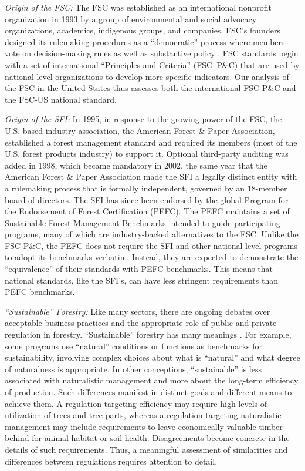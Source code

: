 \documentclass[
      12pt,
            Review ]{article}
\begin{document}
\emph{Origin of the FSC:} The FSC was established as an international nonprofit organization in 1993 by a group of environmental and social advocacy organizations, academics, indigenous groups, and companies. FSC's founders designed its rulemaking procedures as a ``democratic'' process where members vote on decision-making rules as well as substantive policy \citep{Meidinger2003}. FSC standards begin with a set of international ``Principles and Criteria'' (FSC--P\&C) that are used by national-level organizations to develop more specific indicators. Our analysis of the FSC in the United States thus assesses both the international FSC-P\&C and the FSC-US national standard.

\emph{Origin of the SFI:} In 1995, in response to the growing power of the FSC, the U.S.-based industry association, the American Forest \& Paper Association, established a forest management standard and required its members (most of the U.S. forest products industry) to support it. Optional third-party auditing was added in 1998, which became mandatory in 2002, the same year that the American Forest \& Paper Association made the SFI a legally distinct entity with a rulemaking process that is formally independent, governed by an 18-member board of directors. The SFI has since been endorsed by the global Program for the Endorsement of Forest Certification (PEFC). The PEFC maintains a set of Sustainable Forest Management Benchmarks intended to guide participating programs, many of which are industry-backed alternatives to the FSC. Unlike the FSC-P\&C, the PEFC does not require the SFI and other national-level programs to adopt its benchmarks verbatim. Instead, they are expected to demonstrate the ``equivalence'' of their standards with PEFC benchmarks. This means that national standards, like the SFI's, can have less stringent requirements than PEFC benchmarks.

\emph{``Sustainable'' Forestry:} Like many sectors, there are ongoing debates over acceptable business practices and the appropriate role of public and private regulation in forestry. ``Sustainable'' forestry has many meanings \citep{McDermott2012}. For example, some programs use ``natural'' conditions or functions as benchmarks for sustainability, involving complex choices about what is ``natural'' and what degree of naturalness is appropriate. In other conceptions, ``sustainable'' is less associated with naturalistic management and more about the long-term efficiency of production. Such differences manifest in distinct goals and different means to achieve them. A regulation targeting efficiency may require high levels of utilization of trees and tree-parts, whereas a regulation targeting naturalistic management may include requirements to leave economically valuable timber behind for animal habitat or soil health. Disagreements become concrete in the details of such requirements. Thus, a meaningful assessment of similarities and differences between regulations requires attention to detail.
\end{document}
